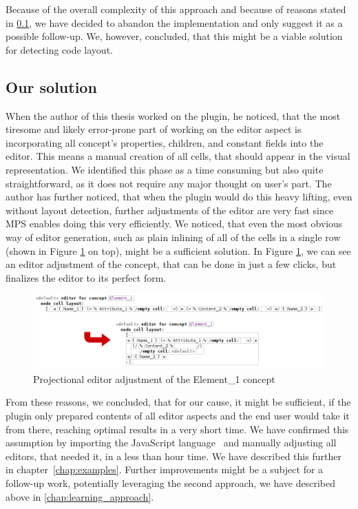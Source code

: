 Because of the overall complexity of this approach and because of reasons stated in \ref{chap:editor_solution}, we have decided to abandon the implementation and only suggest it as a possible follow-up.
We, however, concluded, that this might be a viable solution for detecting code layout.

\subsection{Our solution}
\label{chap:editor_solution}

When the author of this thesis worked on the plugin, he noticed, that the most tiresome and likely error-prone part of working on the editor aspect is incorporating all concept's properties, children, and constant fields into the editor.
This means a manual creation of all cells, that should appear in the visual representation.
We identified this phase as a time consuming but also quite straightforward, as it does not require any major thought on user's part.
The author has further noticed, that when the plugin would do this heavy lifting, even without layout detection, further adjustments of the editor are very fast since MPS enables doing this very efficiently.
We noticed, that even the most obvious way of editor generation, such as plain inlining of all of the cells in a single row (shown in Figure \ref{fig:editor_adjustment} on top), might be a sufficient solution.
In Figure \ref{fig:editor_adjustment}, we can see an editor adjustment of the  concept, that can be done in just a few clicks, but finalizes the editor to its perfect form.
\\

\begin{figure}[h]
	\centering
	\includegraphics[width=\textwidth]{./img/editor_adjustment.png}
	\caption{Projectional editor adjustment of the Element{\_}1 concept}
	\label{fig:editor_adjustment}
\end{figure}

From these reasons, we concluded, that for our cause, it might be sufficient, if the plugin only prepared contents of all editor aspects and the end user would take it from there, reaching optimal results in a very short time.
We have confirmed this assumption by importing the JavaScript language~\cite{javascript} and manually adjusting all editors, that needed it, in a less than hour time.
We have described this further in chapter~\ref{chap:examples}.
Further improvements might be a subject for a follow-up work, potentially leveraging the second approach, we have described above in \ref{chap:learning_approach}.

